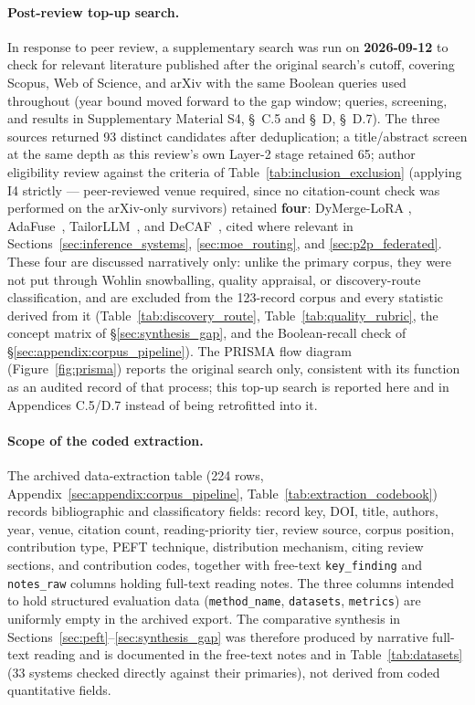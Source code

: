 \paragraph{Post-review top-up search.}
In response to peer review, a supplementary search was run on
\textbf{2026-09-12} to check for relevant literature published after the
original search's cutoff, covering Scopus, Web of Science, and arXiv with
the same Boolean queries used throughout (year bound moved forward to the
gap window; queries, screening, and results in
Supplementary Material S4, \S~C.5 and \S~D,
\S~D.7). The three sources returned 93 distinct candidates after
deduplication; a title/abstract screen at the same depth as this review's
own Layer-2 stage retained 65; author eligibility review against the
criteria of Table~\ref{tab:inclusion_exclusion} (applying I4 strictly ---
peer-reviewed venue required, since no citation-count check was performed on
the arXiv-only survivors) retained \textbf{four}: DyMerge-LoRA
\cite{XuDyMergeLoRA2026}, AdaFuse~\cite{LiAdaFuse2026},
TailorLLM~\cite{WangTailorLLM2026}, and DeCAF~\cite{SaadatiDeCAF2026}, cited
where relevant in Sections~\ref{sec:inference_systems},
\ref{sec:moe_routing}, and \ref{sec:p2p_federated}. These four are discussed
narratively only: unlike the primary corpus, they were not put through
Wohlin snowballing, quality appraisal, or discovery-route classification,
and are excluded from the 123-record corpus and every statistic derived
from it (Table~\ref{tab:discovery_route}, Table~\ref{tab:quality_rubric}, the
concept matrix of \S\ref{sec:synthesis_gap}, and the Boolean-recall check of
\S\ref{sec:appendix:corpus_pipeline}). The PRISMA flow diagram
(Figure~\ref{fig:prisma}) reports the original search only, consistent with
its function as an audited record of that process; this top-up search is
reported here and in Appendices C.5/D.7 instead of being retrofitted into it.

\paragraph{Scope of the coded extraction.}
The archived data-extraction table (224 rows,
Appendix~\ref{sec:appendix:corpus_pipeline}, Table~\ref{tab:extraction_codebook})
records bibliographic and classificatory fields: record key, DOI, title,
authors, year, venue, citation count, reading-priority tier, review source,
corpus position, contribution type, PEFT technique, distribution mechanism,
citing review sections, and contribution codes, together with free-text
\texttt{key\_finding} and \texttt{notes\_raw} columns holding full-text reading
notes. The three columns intended to hold structured evaluation data
(\texttt{method\_name}, \texttt{datasets}, \texttt{metrics}) are uniformly empty
in the archived export. The comparative synthesis in
Sections~\ref{sec:peft}--\ref{sec:synthesis_gap} was therefore produced by
narrative full-text reading and is documented in the free-text notes and in
Table~\ref{tab:datasets} (33 systems checked directly against their primaries),
not derived from coded quantitative fields.

